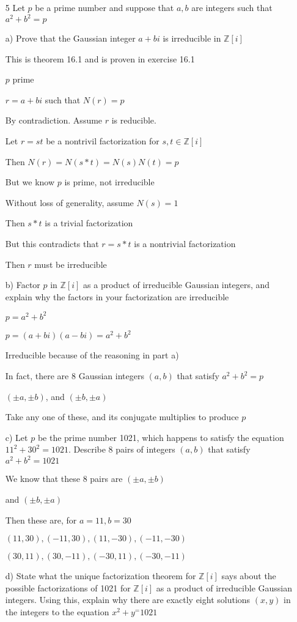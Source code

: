 \documentclass[12pt]{article}
\begin{document}
\begin{itemize}
	\item[5] Let $p$ be a prime number and suppose that $a, b$ are integers such that $a^2 + b^2 = p$

		a) Prove that the Gaussian integer $a+bi$ is irreducible in $\mathbb{Z}[i]$

		This is theorem 16.1 and is proven in exercise 16.1

		$p$ prime
		
		$r = a + bi$ such that $N(r) = p$

		By contradiction. Assume $r$ is reducible.
		
		Let $r = st$ be a nontrivil factorization for $s,t \in\mathbb{Z}[i]$

		Then $N(r) = N(s*t) = N(s)N(t) = p$

		But we know $p$ is prime, not irreducible

		Without loss of generality, assume $N(s) = 1$

		Then $s*t$ is a trivial factorization

		But this contradicts that $r = s*t$ is a nontrivial factorization

		Then $r$ must be irreducible

		b) Factor $p$ in $\mathbb{Z}[i]$ as a product of irreducible Gaussian integers, and explain why the factors in your factorization are irreducible

		$p = a^2 + b^2$

		$p = (a+bi)(a-bi) = a^2 + b^2$

		Irreducible because of the reasoning in part a)

		In fact, there are 8 Gaussian integers $(a,b)$ that satisfy $a^2 + b^2 = p$

		$(\pm a, \pm b)$, and $(\pm b, \pm a)$

		Take any one of these, and its conjugate multiplies to produce $p$

		c) Let $p$ be the prime number 1021, which happens to satisfy the equation $11^2 + 30^2 = 1021$. Describe 8 pairs of integers $(a,b)$ that satisfy $a^2 + b^2 = 1021$

		We know that these 8 pairs are $(\pm a, \pm b)$ 
		
		and $(\pm b, \pm a)$

		Then these are, for $a = 11, b = 30$

		$(11, 30), (-11, 30), (11,-30), (-11,-30)$

		$(30, 11), (30, -11), (-30, 11), (-30, -11)$

		d) State what the unique factorization theorem for $\mathbb{Z}[i]$ says about the possible factorizations of 1021 for $\mathbb{Z}[i]$ as a product of irreducible Gaussian integers. Using this, explain why there are exactly eight solutions $(x,y)$ in the integers to the equation $x^2 + y^ = 1021$


\end{itemize}
\end{document}
